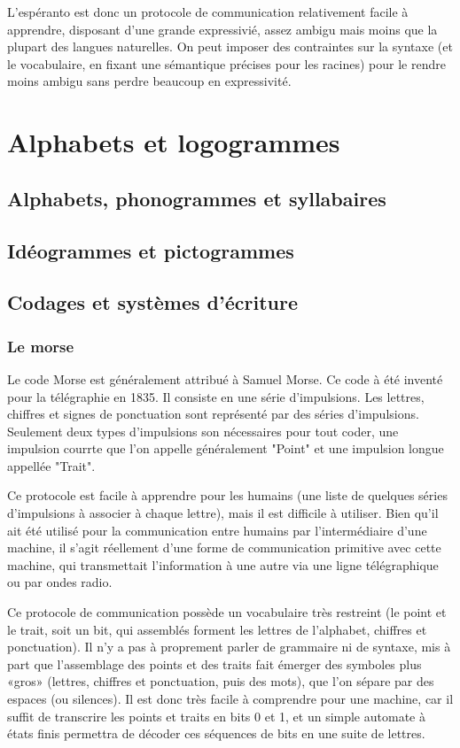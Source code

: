 \documentclass[french,a4paper]{article}
\begin{document}
L'espéranto est donc un protocole de communication relativement facile
à apprendre, disposant d'une grande expressivié, assez ambigu mais
moins que la plupart des langues naturelles. On peut imposer des
contraintes sur la syntaxe (et le vocabulaire, en fixant une
sémantique précises pour les racines) pour le rendre moins ambigu sans
perdre beaucoup en expressivité.

\section{Alphabets et logogrammes}


\subsection{Alphabets, phonogrammes et syllabaires}
\subsection{Idéogrammes et pictogrammes}

\subsection{Codages et systèmes d'écriture}
\subsubsection{Le morse}
Le code Morse est généralement attribué à Samuel Morse. Ce code à été inventé pour la télégraphie en 1835.
Il consiste en une série d'impulsions. Les lettres, chiffres et signes de ponctuation sont représenté par des séries d'impulsions.
Seulement deux types d'impulsions son nécessaires pour tout coder, une impulsion courrte que l'on appelle généralement
"Point" et une impulsion longue appellée "Trait".

Ce protocole est facile à apprendre pour les humains (une liste de
quelques séries d'impulsions à associer à chaque lettre), mais il est
difficile à utiliser. Bien qu'il ait été utilisé pour la communication
entre humains par l'intermédiaire d'une machine, il s'agit réellement
d'une forme de communication primitive avec cette machine, qui
transmettait l'information à une autre via une ligne télégraphique ou
par ondes radio.

Ce protocole de communication possède un vocabulaire très restreint
(le point et le trait, soit un bit, qui assemblés forment les lettres
de l'alphabet, chiffres et ponctuation). Il n'y a pas à proprement
parler de grammaire ni de syntaxe, mis à part que l'assemblage des
points et des traits fait émerger des symboles plus «gros» (lettres,
chiffres et ponctuation, puis des mots), que l'on sépare par des
espaces (ou silences). Il est donc très facile à comprendre pour une
machine, car il suffit de transcrire les points et traits en bits 0 et
1, et un simple automate à états finis permettra de décoder ces
séquences de bits en une suite de lettres.
\end{document}
